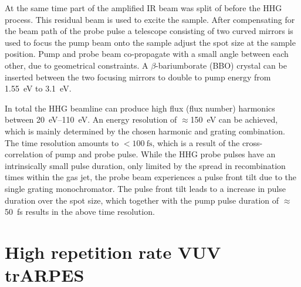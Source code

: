 At the same time part of the amplified IR beam was split of before the HHG process.
This residual beam is used to excite the sample.
After compensating for the beam path of the probe pulse a telescope consisting of two curved mirrors is used to focus the pump beam onto the sample adjust the spot size at the sample position.
Pump and probe beam co-propagate with a small angle between each other, due to geometrical constraints.
A $\beta$-bariumborate (BBO) crystal can be inserted between the two focusing mirrors to double to pump energy from \qty{1.55}{\electronvolt} to \qty{3.1}{\electronvolt}.

In total the HHG beamline can produce high flux (flux number) harmonics between \qtyrange{20}{110}{\electronvolt}.
An energy resolution of $\approx$\qty{150}{\electronvolt} can be achieved, which is mainly determined by the chosen harmonic and grating combination.
The time resolution amounts to $<\qty{100}{\femto\second}$, which is a result of the cross-correlation of pump and probe pulse.
While the HHG probe pulses have an intrinsically small pulse duration, only limited by the spread in recombination times within the gas jet, the probe beam experiences a pulse front tilt due to the single grating monochromator.
The pulse front tilt leads to a increase in pulse duration over the spot size, which together with the pump pulse duration of $\approx$\qty{50}{\femto\second} results in the above time resolution.

\section{High repetition rate VUV trARPES}

